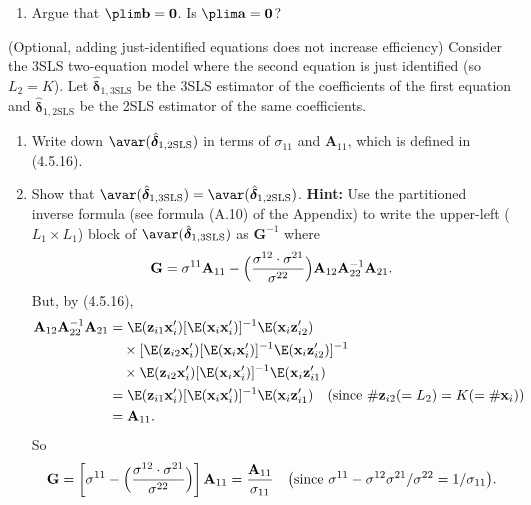 \begin{problemset}
\begin{enumerate}[label=(\alph*)]
\item Argue that $\plim \mathbf{b} = \mathbf{0}$. Is $\plim \mathbf{a} = \mathbf{0}$?
\end{enumerate}

\exercise[10]
(Optional, adding just-identified equations does not increase efficiency)\quad
Consider the 3SLS two-equation model where the second equation is just identified
(so $L_2 = K$). Let $\hat{\boldsymbol{\delta}}_{1,\mathrm{3SLS}}$ be the 3SLS
estimator of the coefficients of the first equation and
$\hat{\boldsymbol{\delta}}_{1,\mathrm{2SLS}}$ be the 2SLS estimator of the same
coefficients.

\begin{enumerate}[label=(\alph*)]
\item Write down $\avar(\hat{\boldsymbol{\delta}}_{1,\mathrm{2SLS}})$ in terms of
$\sigma_{11}$ and $\mathbf{A}_{11}$, which is defined in (4.5.16).

\item Show that
$\avar(\hat{\boldsymbol{\delta}}_{1,\mathrm{3SLS}})
= \avar(\hat{\boldsymbol{\delta}}_{1,\mathrm{2SLS}})$.
\textbf{Hint:} Use the partitioned inverse formula (see formula (A.10) of the
Appendix) to write the upper-left ($L_1 \times L_1$) block of
$\avar(\hat{\boldsymbol{\delta}}_{1,\mathrm{3SLS}})$ as $\mathbf{G}^{-1}$ where
\[
\mathbf{G} = \sigma^{11} \mathbf{A}_{11}
- \Bigl(\frac{\sigma^{12} \cdot \sigma^{21}}{\sigma^{22}}\Bigr)
\mathbf{A}_{12} \mathbf{A}_{22}^{-1} \mathbf{A}_{21}.
\]
But, by (4.5.16),
\begin{align*}
\mathbf{A}_{12} \mathbf{A}_{22}^{-1} \mathbf{A}_{21}
&= \E(\mathbf{z}_{i1} \mathbf{x}_i')
[\E(\mathbf{x}_i \mathbf{x}_i')]^{-1}
\E(\mathbf{x}_i \mathbf{z}_{i2}') \\
&\quad \times [\E(\mathbf{z}_{i2} \mathbf{x}_i')
[\E(\mathbf{x}_i \mathbf{x}_i')]^{-1}
\E(\mathbf{x}_i \mathbf{z}_{i2}')]^{-1} \\
&\quad \times \E(\mathbf{z}_{i2} \mathbf{x}_i')
[\E(\mathbf{x}_i \mathbf{x}_i')]^{-1}
\E(\mathbf{x}_i \mathbf{z}_{i1}') \\
&= \E(\mathbf{z}_{i1} \mathbf{x}_i')
[\E(\mathbf{x}_i \mathbf{x}_i')]^{-1}
\E(\mathbf{x}_i \mathbf{z}_{i1}')
\quad (\text{since } \#\mathbf{z}_{i2} (= L_2) = K (= \#\mathbf{x}_i)) \\
&= \mathbf{A}_{11}.
\end{align*}
So
\[
\mathbf{G} = \left[\sigma^{11}
- \Bigl(\frac{\sigma^{12} \cdot \sigma^{21}}{\sigma^{22}}\Bigr)\right]
\mathbf{A}_{11}
= \frac{\mathbf{A}_{11}}{\sigma_{11}}
\quad \bigl(\text{since } \sigma^{11}
- \sigma^{12}\sigma^{21}/\sigma^{22} = 1/\sigma_{11}\bigr).
\]
\end{enumerate}


\end{problemset}
